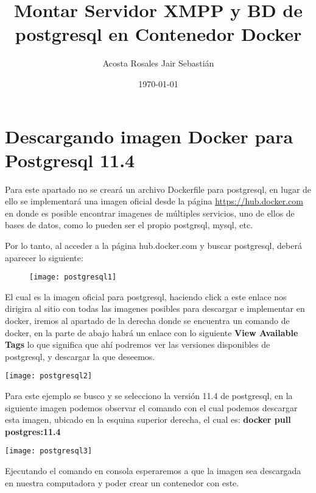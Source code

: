 \documentclass[10pt,letterpaper]{article}
\begin{document}
\title{Montar Servidor XMPP y BD de postgresql en Contenedor Docker}
\author{Acosta Rosales Jair Sebastián}
\date{\today}
\maketitle

\section{Descargando imagen Docker para Postgresql 11.4}

Para este apartado no se creará un archivo Dockerfile para postgresql, en lugar de ello se implementará una imagen oficial desde la página \url{https://hub.docker.com} en donde es posible encontrar imagenes de múltiples servicios, uno de ellos de bases de datos, como lo pueden ser el propio postgrsql, mysql, etc.

Por lo tanto, al acceder a la página hub.docker.com y buscar postgresql, deberá aparecer lo siguiente:\\


\begin{figure}[htb]
\centering
\texttt{[image: postgresql1]}
\end{figure}

El cual es la imagen oficial para postgresql, haciendo click a este enlace nos dirigira al sitio con todas las imagenes posibles para descargar e implementar en docker, iremos al apartado de la derecha donde se encuentra un comando de docker, en la parte de abajo habrá un enlace con lo siguiente \textbf{View Available Tags} lo que significa que ahí podremos ver las versiones disponibles de postgresql, y descargar la que deseemos.

\begin{center}
\texttt{[image: postgresql2]}
\end{center}

Para este ejemplo se busco y se selecciono la versión 11.4 de postgresql, en la siguiente imagen podemos observar el comando con el cual podemos descargar esta imagen, ubicado en la esquina superior derecha, el cual es: \textbf{docker pull postgres:11.4}\\

\begin{center}
\centering
\texttt{[image: postgresql3]}
\end{center}

Ejecutando el comando en consola esperaremos a que la imagen sea descargada en nuestra computadora y poder crear un contenedor con este.
\end{document}
